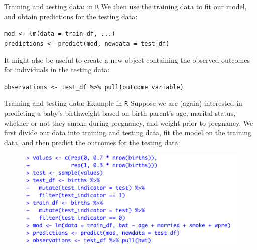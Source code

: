 \documentclass[10pt,t]{beamer}
\begin{document}
\begin{frame}{Training and testing data: in \texttt{R}}
We then use the training data to fit our model, and obtain predictions for the testing data:

\vspace{0.3cm}

\texttt{mod <- lm(data = train\_df, ...)} \\
\texttt{predictions <- predict(mod, newdata = test\_df)}

\vspace{0.3cm} \pause

It might also be useful to create a new object containing the observed outcomes for individuals in the testing data:

\vspace{0.3cm}

\texttt{observations <- test\_df \%>\% pull(outcome variable)}

\end{frame}

\begin{frame}{Training and testing data: Example in \texttt{R}}
Suppose we are (again) interested in predicting a baby's birthweight based on birth parent's age, marital status, whether or not they smoke during pregnancy, and weight prior to pregnancy. We first divide our data into training and testing data, fit the model on the training data, and then predict the outcomes for the testing data:

\begin{figure}
	\centering \includegraphics[scale=0.5]{traintest2.png}
\end{figure}
\end{frame}
\end{document}
